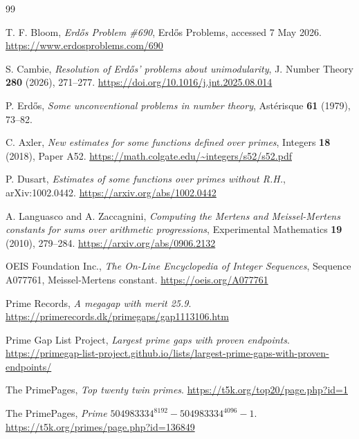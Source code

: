 \documentclass[11pt]{article}
\numberwithin{equation}{section}
\theoremstyle{plain}
\theoremstyle{definition}
\theoremstyle{remark}
\begin{document}
\begin{thebibliography}{99}


T. F. Bloom,
\emph{Erd\H{o}s Problem \#690},
Erd\H{o}s Problems, accessed 7 May 2026.
\url{https://www.erdosproblems.com/690}

S. Cambie,
\emph{Resolution of Erd\H{o}s' problems about unimodularity},
J. Number Theory \textbf{280} (2026), 271--277.
\url{https://doi.org/10.1016/j.jnt.2025.08.014}

P. Erd\H{o}s,
\emph{Some unconventional problems in number theory},
Ast\'{e}risque \textbf{61} (1979), 73--82.

C. Axler,
\emph{New estimates for some functions defined over primes},
Integers \textbf{18} (2018), Paper A52.
\url{https://math.colgate.edu/~integers/s52/s52.pdf}

P. Dusart,
\emph{Estimates of some functions over primes without R.H.},
arXiv:1002.0442.
\url{https://arxiv.org/abs/1002.0442}


A. Languasco and A. Zaccagnini,
\emph{Computing the Mertens and Meissel-Mertens constants for sums over arithmetic progressions},
Experimental Mathematics \textbf{19} (2010), 279--284.
\url{https://arxiv.org/abs/0906.2132}

OEIS Foundation Inc.,
\emph{The On-Line Encyclopedia of Integer Sequences}, Sequence A077761, Meissel-Mertens constant.
\url{https://oeis.org/A077761}

Prime Records,
\emph{A megagap with merit 25.9}.
\url{https://primerecords.dk/primegaps/gap1113106.htm}

Prime Gap List Project,
\emph{Largest prime gaps with proven endpoints}.
\url{https://primegap-list-project.github.io/lists/largest-prime-gaps-with-proven-endpoints/}

The PrimePages,
\emph{Top twenty twin primes}.
\url{https://t5k.org/top20/page.php?id=1}

The PrimePages,
\emph{Prime \(504983334^{8192}-504983334^{4096}-1\)}.
\url{https://t5k.org/primes/page.php?id=136849}

\end{thebibliography}
\end{document}
